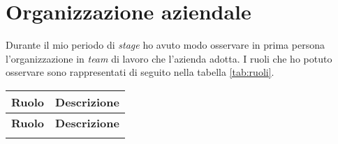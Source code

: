 \section{Organizzazione aziendale}
Durante il mio periodo di \textit{stage} ho avuto modo osservare in prima persona l'organizzazione in \textit{team} di lavoro che l'azienda adotta.
I ruoli che ho potuto osservare sono rappresentati di seguito nella tabella \ref{tab:ruoli}.
\begin{longtable}{|>{\RaggedRight\arraybackslash}p{3.5cm}|>{\RaggedRight\arraybackslash}p{8.5cm}|}
    \hline
    \rowcolor{tableheader}\textbf{Ruolo} & \textbf{Descrizione} \\
    \hline
    \endfirsthead

    \rowcolor{tableheader}\textbf{Ruolo} & \textbf{Descrizione} \\
    \hline
    \endhead

    \hline
    \endfoot

    \hline
    \endlastfoot


\end{longtable}
